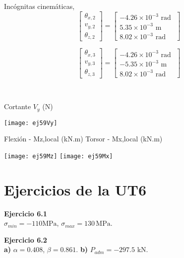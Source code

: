 \begin{minipage}{0.45\textwidth}
	Incógnitas cinemáticas,
	$$
	\left[
	\begin{matrix}
	\theta_{x,2} \\
	v_{y,2} \\
	\theta_{z,2}
	\end{matrix}
	\right]
	=
	\left[
	\begin{matrix}
	-4.26\times 10^{-3} \text{ rad }\\
	 5.35\times 10^{-3} \text{ m }\\
	8.02\times 10^{-3} \text{ rad }
	\end{matrix}
	\right]
	$$
	
	$$
	\left[
	\begin{matrix}
	\theta_{x,3} \\
	v_{y,3} \\
	\theta_{z,3}
	\end{matrix}
	\right]
	=
	\left[
	\begin{matrix}
	-4.26\times 10^{-3} \text{ rad }\\
	-5.35\times 10^{-3} \text{ m }\\
	 8.02\times 10^{-3} \text{ rad }
	\end{matrix}
	\right]
	$$
\end{minipage}
~
\begin{minipage}{0.45\textwidth}
	Cortante $V_y$ (N)
	
	\texttt{[image: ej59Vy]}
\end{minipage}


Flexión - Mz,local (kN.m) \hfill  Torsor - Mx,local (kN.m)

\texttt{[image: ej59Mz]}
\texttt{[image: ej59Mx]}



\section{Ejercicios de la UT6}

\textbf{Ejercicio 6.1}\\

 $\sigma_{min} = -110 \text{MPa}$, $\sigma_{max} = 130 \, \text{MPa}$.\newline


\textbf{Ejercicio 6.2}\\

\textbf{a)} $\alpha = 0.408$, $\beta = 0.861$. 
\textbf{b)} $P_{adm} = -297.5 $ kN.\newline

